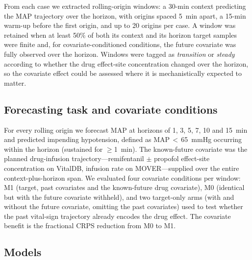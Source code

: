 \documentclass[11pt]{article}
\begin{document}
From each case we extracted rolling-origin windows: a 30-min context
predicting the MAP trajectory over the horizon, with origins spaced 5~min
apart, a 15-min warm-up before the first origin, and up to 20 origins per
case. A window was retained when at least 50\% of both its context and its
horizon target samples were finite and, for covariate-conditioned
conditions, the future covariate was fully observed over the horizon. Windows
were tagged as \emph{transition} or \emph{steady} according to whether the
drug effect-site concentration changed over the horizon, so the covariate
effect could be assessed where it is mechanistically expected to matter.

\subsection{Forecasting task and covariate conditions}

For every rolling origin we forecast MAP at horizons of 1, 3, 5, 7, 10 and
15~min and predicted impending hypotension, defined as MAP\,$<$\,65~mmHg
occurring within the horizon (sustained for $\geq$1~min). The known-future
covariate was the planned drug-infusion trajectory---remifentanil
$\pm$ propofol effect-site concentration on VitalDB, infusion rate on
MOVER---supplied over the entire context-plus-horizon span. We evaluated four
covariate conditions per window: M1 (target, past covariates and the
known-future drug covariate), M0 (identical but with the future covariate
withheld), and two target-only arms (with and without the future covariate,
omitting the past covariates) used to test whether the past vital-sign
trajectory already encodes the drug effect. The covariate benefit is the
fractional CRPS reduction from M0 to M1.

\subsection{Models}
\end{document}
